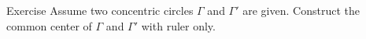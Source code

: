 \begin{thm}{Exercise}\label{ex:concentric-circ}
Assume two concentric circles $\Gamma$ and $\Gamma'$ are given.
Construct the common center of $\Gamma$ and $\Gamma'$ with ruler only.
\end{thm}


